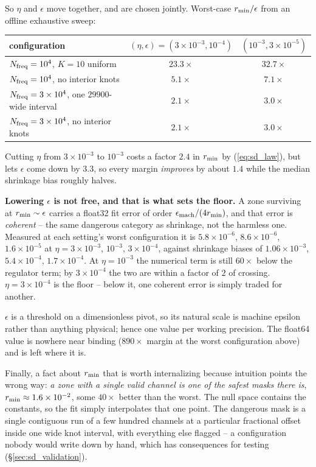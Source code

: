 \documentclass{article}
\numberwithin{equation}{section}   %
\begin{document}
So $\eta$ and $\epsilon$ move together, and are chosen jointly.  Worst-case $r_{\rm min}/\epsilon$ from an
offline exhaustive sweep:
\begin{center}
\small
\begin{tabular}{lcc}
\toprule
configuration & $(\eta,\epsilon) = (3\times10^{-3}, 10^{-4})$ & $(10^{-3}, 3\times10^{-5})$ \\
\midrule
$N_{\rm freq} = 10^4$, $K = 10$ uniform          & $23.3\times$ & $32.7\times$ \\
$N_{\rm freq} = 10^4$, no interior knots         & $5.1\times$  & $7.1\times$ \\
$N_{\rm freq} = 3\times10^4$, one $29900$-wide interval & $2.1\times$ & $3.0\times$ \\
$N_{\rm freq} = 3\times10^4$, no interior knots  & $2.1\times$  & $3.0\times$ \\
\bottomrule
\end{tabular}
\end{center}
Cutting $\eta$ from $3\times10^{-3}$ to $10^{-3}$ costs a factor $2.4$ in $r_{\rm min}$ by (\ref{eq:sd_law}),
but lets $\epsilon$ come down by $3.3$, so every margin {\em improves} by about $1.4$ while the median
shrinkage bias roughly halves.

{\bf Lowering $\epsilon$ is not free, and that is what sets the floor.}  A zone surviving at
$r_{\rm min} \sim \epsilon$ carries a float32 fit error of order $\epsilon_{\rm mach}/(4 r_{\rm min})$, and
that error is {\em coherent} -- the same dangerous category as shrinkage, not the harmless one.  Measured at
each setting's worst configuration it is $5.8\times10^{-6}$, $8.6\times10^{-6}$, $1.6\times10^{-5}$ at
$\eta = 3\times10^{-3}$, $10^{-3}$, $3\times10^{-4}$, against shrinkage biases of $1.06\times10^{-3}$,
$5.4\times10^{-4}$, $1.7\times10^{-4}$.  At $\eta = 10^{-3}$ the numerical term is still $60\times$ below the
regulator term; by $3\times10^{-4}$ the two are within a factor of $2$ of crossing.  $\eta = 3\times10^{-4}$ is
the floor -- below it, one coherent error is simply traded for another.

$\epsilon$ is a threshold on a dimensionless pivot, so its natural scale is machine epsilon rather than
anything physical; hence one value per working precision.  The float64 value is nowhere near binding
($890\times$ margin at the worst configuration above) and is left where it is.

Finally, a fact about $r_{\rm min}$ that is worth internalizing because intuition points the wrong way: {\em a
zone with a single valid channel is one of the safest masks there is}, $r_{\rm min} \approx 1.6\times10^{-2}$,
some $40\times$ better than the worst.  The null space contains the constants, so the fit simply interpolates
that one point.  The dangerous mask is a single contiguous run of a few hundred channels at a particular
fractional offset inside one wide knot interval, with everything else flagged -- a configuration nobody would
write down by hand, which has consequences for testing (\S\ref{sec:sd_validation}).
\end{document}

